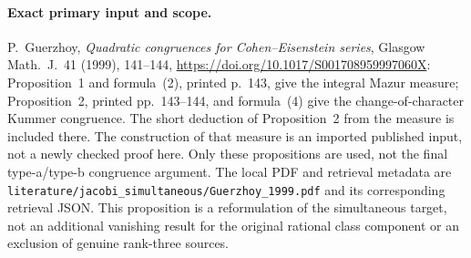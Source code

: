 \paragraph{Exact primary input and scope.}
P.~Guerzhoy, \emph{Quadratic congruences for Cohen--Eisenstein
series}, Glasgow Math.~J.~41 (1999), 141--144,
\url{https://doi.org/10.1017/S001708959997060X}:
Proposition~1 and formula~(2), printed p.~143, give the integral
Mazur measure; Proposition~2, printed pp.~143--144,
and formula~(4) give the change-of-character Kummer congruence.
The short deduction of Proposition~2 from the measure is included
there.  The construction of that measure is an imported published
input, not a newly checked proof here.  Only these propositions
are used, not the final type-a/type-b congruence argument.
The local PDF and retrieval metadata are
\texttt{literature/jacobi\_simultaneous/Guerzhoy\_1999.pdf}
and its corresponding retrieval JSON.
This proposition is a reformulation of the simultaneous target,
not an additional vanishing result for the original rational class
component or an exclusion of genuine rank-three sources.

